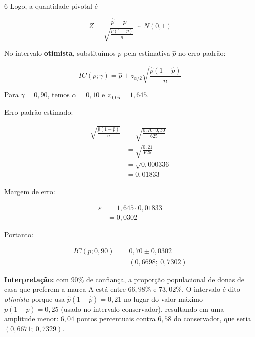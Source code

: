 \documentclass[8pt, a4paper, landscape]{extarticle}
\begin{document}
\begin{multicols}{6}
Logo, a quantidade pivotal é

\begin{equation*}
Z = \frac{\hat{p} - p}{\sqrt{\frac{p(1-p)}{n}}} \sim N(0,1)
\end{equation*}

No intervalo \textbf{otimista}, substituímos $p$ pela estimativa $\hat{p}$ no erro padrão:

\begin{equation*}
IC(p;\gamma) = \hat{p} \pm z_{\alpha/2}\sqrt{\frac{\hat{p}(1-\hat{p})}{n}}
\end{equation*}

Para $\gamma = 0,90$, temos $\alpha = 0,10$ e $z_{0,05} = 1,645$.

Erro padrão estimado:

\begin{equation*}
\begin{split}
\sqrt{\frac{\hat{p}(1-\hat{p})}{n}} &= \sqrt{\frac{0,70 \cdot 0,30}{625}} \\
&= \sqrt{\frac{0,21}{625}} \\
&= \sqrt{0,000336} \\
&= 0,01833
\end{split}
\end{equation*}

Margem de erro:

\begin{equation*}
\begin{split}
\varepsilon &= 1,645 \cdot 0,01833 \\
&= 0,0302
\end{split}
\end{equation*}

Portanto:

\begin{equation*}
\begin{split}
IC(p;0,90) &= 0,70 \pm 0,0302 \\
&= (0,6698;\ 0,7302)
\end{split}
\end{equation*}

\textbf{Interpretação:} com $90\%$ de confiança, a proporção populacional de donas de casa que preferem a marca A está entre $66,98\%$ e $73,02\%$. O intervalo é dito \textit{otimista} porque usa $\hat{p}(1-\hat{p}) = 0,21$ no lugar do valor máximo $p(1-p) = 0,25$ (usado no intervalo conservador), resultando em uma amplitude menor: $6,04$ pontos percentuais contra $6,58$ do conservador, que seria $(0,6671;\ 0,7329)$.


\end{multicols}
\end{document}
